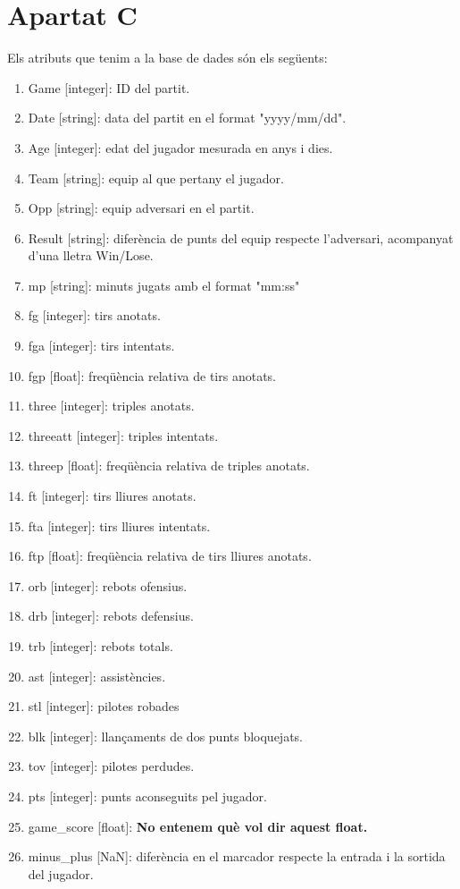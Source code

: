 \documentclass{article}
\begin{document}
\section*{Apartat C}
Els atributs que tenim a la base de dades són els següents:
\begin{enumerate}
	\addtocounter{enumi}{-1}
	\item Game [integer]: ID del partit.
	\item Date [string]: data del partit en el format "yyyy/mm/dd".
	\item Age [integer]: edat del jugador mesurada en anys i dies.
	\item Team [string]: equip al que pertany el jugador. 
	\item Opp [string]: equip adversari en el partit.
	\item Result [string]: diferència de punts del equip respecte l'adversari, acompanyat d'una lletra Win/Lose.
	\item mp [string]: minuts jugats amb el format "mm:ss"
	\item fg [integer]: tirs anotats.
	\item fga [integer]: tirs intentats.
	\item fgp [float]: freqüència relativa de tirs anotats.
	\item three [integer]: triples anotats.
	\item threeatt [integer]: triples intentats.
	\item threep [float]: freqüència relativa de triples anotats.
	\item ft [integer]: tirs lliures anotats.
	\item fta [integer]: tirs lliures intentats.
	\item ftp [float]: freqüència relativa de tirs lliures anotats.
	\item orb [integer]: rebots ofensius.
	\item drb [integer]: rebots defensius.
	\item trb [integer]: rebots totals.
	\item ast [integer]: assistències.
	\item stl [integer]: pilotes robades
	\item blk [integer]: llançaments de dos punts bloquejats.
	\item tov [integer]: pilotes perdudes.
	\item pts [integer]: punts aconseguits pel jugador.
	\item game\_score [float]: \textbf{No entenem què vol dir aquest float.}
	\item minus\_plus [NaN]: diferència en el marcador respecte la entrada i la sortida del jugador.
\end{enumerate}
\end{document}
